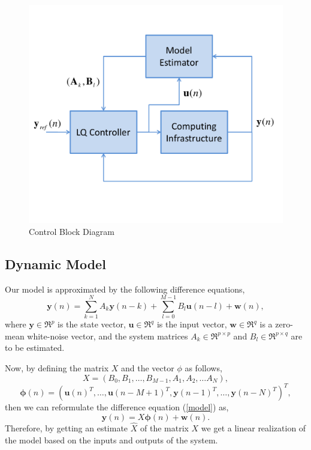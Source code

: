 \documentclass{sig-alternate}
\begin{document}
\begin{figure}[h]
  \begin{center}
    \includegraphics[width=.49\textwidth]{Fig_Closed_Loop}
  \end{center}
  \caption{Control Block Diagram}
  \label{fig:control}
\end{figure}

\subsection{Dynamic Model}
Our model is approximated by the following difference equations,
\begin{equation}
 \mathbf{y}(n) = \sum_{k=1}^{N}A_{k}\mathbf{y}(n-k)+ \sum_{l=0}^{M-1}B_{l}\mathbf{u}(n-l) + \mathbf{w}(n),
 \label{model}
\end{equation}
where $\mathbf{y} \in \Re^{p}$ is the state vector, $\mathbf{u} \in \Re^{q}$ is the input vector, 
$\mathbf{w} \in \Re^{q}$ is a zero-mean white-noise vector, 
and the system matrices $A_{k} \in \Re^{p \times p}$ and $B_{l} \in \Re^{p \times q}$ 
are to be estimated.

Now, by defining the matrix $X$ and the vector $\phi$ as follows,
\begin{equation}
 X = \left( B_{0},B_{1},\ldots,B_{M-1},A_{1},A_{2},\ldots A_{N} \right),
 \label{system}
\end{equation}
\begin{displaymath}
 \mathbf{\phi}(n) = ( \mathbf{u}(n)^{T},\ldots,\mathbf{u}(n-M+1)^{T},\mathbf{y}(n-1)^{T},\dots,\mathbf{y}(n-N)^{T})^{T},
\end{displaymath}
then we can reformulate the difference equation (\ref{model}) as,
\begin{displaymath}
\mathbf{y}(n) = X\mathbf{\phi}(n) + \mathbf{w}(n).
\end{displaymath}
Therefore, by getting an estimate $\hat{X}$ of the matrix $X$ we get a linear realization of the model based on the inputs
and outputs of the system.
\end{document}
